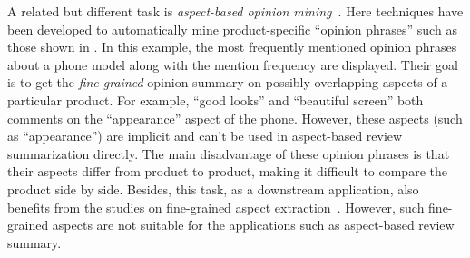 A related but different task is \textit{aspect-based opinion 
mining}~\cite{su2008hidden,zeng2013classification,manek2017aspect}.
Here techniques have been developed to automatically mine
product-specific ``opinion phrases'' such as those shown in 
.
In this example, the most frequently mentioned opinion phrases
about a phone model along with the mention frequency
are displayed. 
Their goal is to get the {\em fine-grained} opinion summary on
possibly overlapping aspects of a particular product.
For example, ``good looks'' and ``beautiful screen'' both comments
on the ``appearance'' aspect of the phone. However, these aspects (such
as ``appearance'')
are implicit and can't be used in aspect-based review summarization
directly. 
The main disadvantage of these opinion phrases is that
their aspects differ from product to product, making it difficult to compare the product side by side. 
Besides, this task, as a downstream application,
also benefits from the studies on fine-grained aspect extraction~\cite{vo2018automatic,dragoni2018unsupervised}.
However, such fine-grained aspects are not 
suitable for the applications such as aspect-based review summary.



